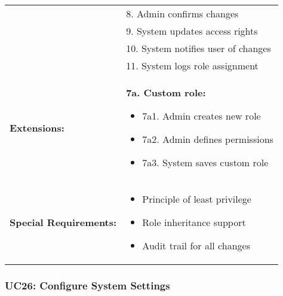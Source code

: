 \documentclass[12pt]{article}
\begin{document}
\begin{longtable}{|p{3cm}|p{11cm}|}
& 8. Admin confirms changes \\
& 9. System updates access rights \\
& 10. System notifies user of changes \\
& 11. System logs role assignment \\
\hline
\textbf{Extensions:} & 
\textbf{7a. Custom role:}
\begin{itemize}
    \item 7a1. Admin creates new role
    \item 7a2. Admin defines permissions
    \item 7a3. System saves custom role
\end{itemize} \\
\hline
\textbf{Special Requirements:} & 
\begin{itemize}
    \item Principle of least privilege
    \item Role inheritance support
    \item Audit trail for all changes
\end{itemize} \\
\hline
\end{longtable}

\subsubsection{UC26: Configure System Settings}
\end{document}
